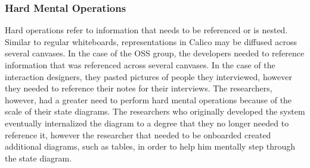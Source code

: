 \subsubsection{Hard Mental Operations}
Hard operations refer to information that needs to be referenced or is nested. Similar to regular whiteboards, representations in Calico may be diffused across several canvases. In the case of the OSS group, the developers needed to reference information that was referenced across several canvases. In the case of the interaction designers, they pasted pictures of people they interviewed, however they needed to reference their notes for their interviews. The researchers, however, had a greater need to perform hard mental operations because of the scale of their state diagrams. The researchers who originally developed the system eventually internalized the diagram to a degree that they no longer needed to reference it, however the researcher that needed to be onboarded created additional diagrams, such as tables, in order to help him mentally step through the state diagram.


%

